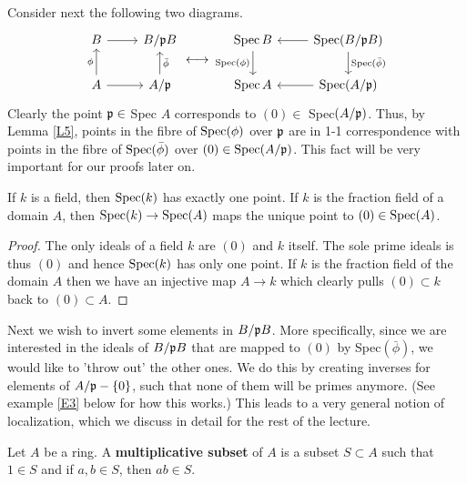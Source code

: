 \documentclass{../mathnotes}
\begin{document}
\begin{rem}
Consider next the following two diagrams. 
\[
\begin{tikzcd}
B\arrow{r} & B/\fr pB\\
A\arrow{u}{\phi}\arrow{r} & A/\fr p\arrow[swap]{u}{\bar\phi}
\end{tikzcd}
\longleftrightarrow
\begin{tikzcd}
\Spec B\arrow[swap]{d}{\Spec(\phi)} & \arrow{l}\arrow{d}{\Spec(\bar\phi)}\Spec(B/\fr pB)\\
\Spec A & \arrow{l}\Spec(A/\fr p)
\end{tikzcd}
\]
Clearly the point $\mathfrak p \in$ Spec $A$ corresponds to $(0) \in$ Spec$(A/\mathfrak p)$. Thus, by Lemma \ref{L5}, points in the fibre of $\operatorname{Spec}(\phi)$ over $\mathfrak p$ are in 1-1 correspondence with points in the fibre of $\operatorname{Spec}(\bar \phi)$ over $(0)\in\operatorname{Spec}(A/\mathfrak p)$. This fact will be very important for our proofs later on.
\end{rem}

\begin{lem}
\label{L6}
    If $k$ is a field, then $\operatorname{Spec}(k)$ has exactly one point. If $k$ is the fraction field of a domain $A$, then $\operatorname{Spec}(k)\to\operatorname{Spec}(A)$
    maps the unique point to $(0)\in\operatorname{Spec}(A)$.
\end{lem}
\begin{proof}
    The only ideals of a field $k$ are $(0)$ and $k$ itself. The sole prime ideals is thus $(0)$ and hence $\operatorname{Spec}(k)$ has only one point.
    If $k$ is the fraction field of the domain $A$ then we have an injective map $A\to k$ which clearly pulls $(0)\subset k$ back to $(0)\subset A$. 
\end{proof}

Next we wish to invert some elements in $B/\mathfrak p B$. More specifically, since we are interested in the ideals of $B/\mathfrak p B$ that are mapped to $(0)$ by Spec$(\bar \phi)$, we would like to 'throw out' the other ones. We do this by creating inverses for elements of $A/\mathfrak p - \{0\}$, such that none of them will be primes anymore. (See example \ref{E3} below for how this works.) This leads to a very general notion of localization, which we discuss in detail for the rest of the lecture.

\begin{defn}
    Let $A$ be a ring. A \textbf{multiplicative subset} of $A$ is a subset $S\subset A$ such that $1\in S$ and if $a,b\in S$,
    then $ab\in S$.
\end{defn}
\end{document}
